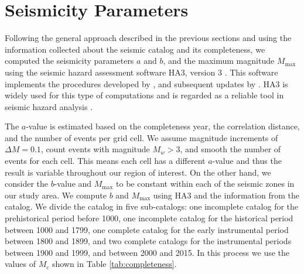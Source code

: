 
\section{Seismicity Parameters}
\label{sec:params}

Following the general approach described in the previous sections and using the information collected about the seismic catalog and its completeness, we computed the seismicity parameters $a$ and $b$, and the maximum magnitude $M_{\max}$ using the seismic hazard assessment software HA3, version 3 \citep{Kijko_2004_HA3}. This software implements the procedures developed by \citet{Kijko_1989_BSSA, Kijko_1992_BSSA}, and subsequent updates by \citet{Kijko_2004_PAG}. HA3 is widely used for this type of computations and is regarded as a reliable tool in seismic hazard analysis \citep[see, for instance,][]{Karimiparidari2013, Khodaverdian_2016_BSSA}.

The $a$-value is estimated based on the completeness year, the correlation distance, and the number of events per grid cell. We assume magnitude increments of $\Delta M = 0.1$, count events with magnitude $M_w > 3$, and smooth the number of events for each cell. This means each cell has a different $a$-value and thus the result is variable throughout our region of interest. On the other hand, we consider the $b$-value and $M_{\max}$ to be constant within each of the seismic zones in our study area. We compute $b$ and $M_{\max}$ using HA3 and the information from the catalog.  We divide the catalog in five sub-catalogs: one incomplete catalog for the prehistorical period before 1000, one incomplete catalog for the historical period between 1000 and 1799, one complete catalog for the early instrumental period between 1800 and 1899, and two complete catalogs for the instrumental periods between 1900 and 1999, and between 2000 and 2015. In this process we use the values of $M_c$ shown in Table \ref{tab:completeness}.

